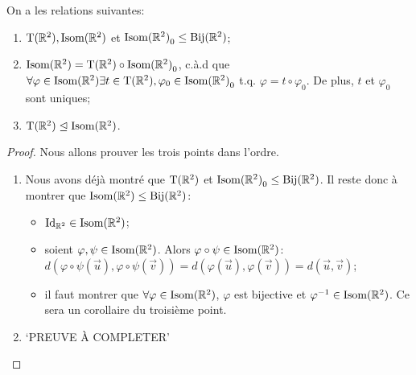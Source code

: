 \documentclass{book}
\numberwithin{equation}{section}
\renewcommand{\phi}{\varphi}
\providecommand{\plan}{{\mathbb R^2}}
\providecommand{\id}{{\textnormal{Id}}}
\providecommand{\idR}{{\id_\plan}}
\providecommand{\transR}{{\textnormal{T}(\plan)}}
\providecommand{\isom}{{\textnormal{Isom}(\plan)}}
\providecommand{\isomo}{{\isom_0}}
\providecommand{\bij}[1]{{\textnormal{Bij}(#1)}}
\providecommand{\bijR}{{\bij{\plan}}}
\providecommand{\subgroupeq}{\leq}
\providecommand{\subgroupnormaleq}{\trianglelefteq}
\begin{document}
\begin{thm}
	On a les relations suivantes:
	\begin{enumerate}
		\item $\transR, \isom$ et $\isomo \subgroupeq \bijR$;
		\item $\isom = \transR \circ \isomo$, c.à.d que $\forall \phi \in \isom \exists t \in \transR, \phi_0 \in \isomo$ t.q. $\phi = t \circ \phi_0$. De plus, $t$ et $\phi_0$ sont uniques;
		\item $\transR \subgroupnormaleq \isom$.
	\end{enumerate}
\end{thm}

\begin{proof}
	Nous allons prouver les trois points dans l'ordre.
	\begin{enumerate}
		\item Nous avons déjà montré que $\transR$ et $\isomo \subgroupeq \bijR$. Il reste donc à montrer que $\isom \subgroupeq \bijR$:
		\begin{itemize}
			\item $\idR \in \isom$;
			\item soient $\phi, \psi \in \isom$. Alors $\phi \circ \psi \in \isom$: $d(\phi \circ \psi(\vec u), \phi \circ \psi(\vec v)) = d(\phi(\vec u), \phi(\vec v)) = d(\vec u, \vec v)$;
			\item il faut montrer que $\forall \phi \in \isom$, $\phi$ est bijective et $\phi^{-1} \in \isom$. Ce sera un corollaire du troisième point.
		\end{itemize}
		
		\item `PREUVE À COMPLETER'
		

\end{enumerate}
\end{proof}
\end{document}
